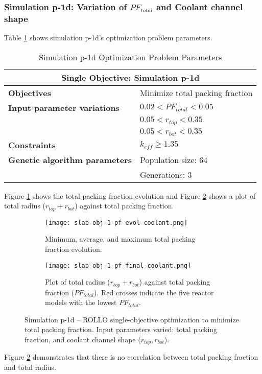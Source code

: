 \subsubsection{Simulation p-1d: Variation of $PF_{total}$ and Coolant channel shape}
Table \ref{tab:simulationp1d} shows simulation p-1d's optimization problem parameters. 
\begin{table}[htbp!]
    \centering
    \onehalfspacing
    \caption{Simulation p-1d Optimization Problem Parameters}
	\label{tab:simulationp1d}
    \footnotesize
    \begin{tabular}{l|p{5cm}}
    \hline 
    \multicolumn{2}{c}{\textbf{Single Objective: Simulation p-1d}} \\
    \hline 
    \textbf{Objectives} & Minimize total packing fraction\\
    \hline 
    \textbf{Input parameter variations} & $0.02<PF_{total}<0.05$ \\
    & $0.05<r_{top}<0.35$ \\
    & $0.05<r_{bot}<0.35$ \\
    \hline
    \textbf{Constraints} & $k_{eff} \geq 1.35$\\ 
    \hline 
    \textbf{Genetic algorithm parameters} & Population size: 64 \\
    & Generations: 3 \\
    \hline
    \end{tabular}
\end{table}

Figure \ref{fig:slab-obj-1-pf-evol-coolant} shows the total packing fraction evolution 
and Figure \ref{fig:slab-obj-1-pf-final-coolant} shows a plot of total radius 
($r_{top} + r_{bot}$) against total packing fraction. 
\begin{figure}[htbp!]
    \centering
    \begin{subfigure}{\textwidth}
        \texttt{[image: slab-obj-1-pf-evol-coolant.png]}
        \caption{Minimum, average, and maximum total packing fraction evolution.}
        \label{fig:slab-obj-1-pf-evol-coolant} 
    \end{subfigure}
    \begin{subfigure}{\textwidth}
        \texttt{[image: slab-obj-1-pf-final-coolant.png]}
        \caption{Plot of total radius ($r_{top} + r_{bot}$) against total packing 
        fraction ($PF_{total}$). Red crosses indicate the five reactor models with the 
        lowest $PF_{total}$.}
        \label{fig:slab-obj-1-pf-final-coolant} 
    \end{subfigure}
    \caption{Simulation p-1d -- ROLLO single-objective optimization to minimize total 
    packing fraction. Input parameters varied: total packing fraction, and coolant 
    channel shape ($r_{top}, r_{bot}$).}
    \label{fig:slab-obj-1-pf-coolant}
\end{figure}
Figure \ref{fig:slab-obj-1-pf-final-coolant} demonstrates that there is no correlation 
between total packing fraction and total radius. 

